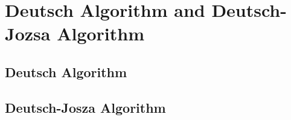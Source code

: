 \section{Deutsch Algorithm and Deutsch-Jozsa Algorithm}
\subsection{Deutsch Algorithm}
\subsection{Deutsch-Josza Algorithm}

